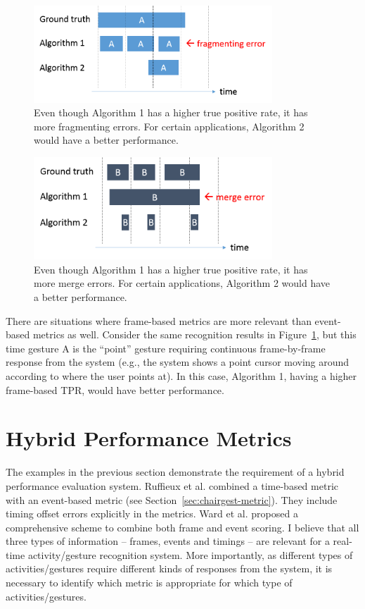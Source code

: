 \begin{figure}[tbh]
\centering
\includegraphics[width=0.8\textwidth]{figures/fragment.png}
\caption{Even though Algorithm 1 has a higher true positive rate, it has more
fragmenting errors. For certain applications, Algorithm 2 would have a better
performance.}
\label{fig:fragment}
\end{figure}

\begin{figure}[tbh]
\centering
\includegraphics[width=0.8\textwidth]{figures/merge.png}
\caption{Even though Algorithm 1 has a higher true positive rate, it has more
merge errors. For certain applications, Algorithm 2 would have a better
performance.}
\label{fig:merge}
\end{figure}

There are situations where frame-based metrics are more relevant than
event-based metrics as well. Consider the same recognition results in
Figure~\ref{fig:fragment}, but this time gesture A is the ``point'' gesture
requiring continuous frame-by-frame response from the system (e.g., the system
shows a point cursor moving around according to where the user points at). In this case,
Algorithm 1, having a higher frame-based TPR, would have
better performance.

\section{Hybrid Performance Metrics}\label{sec:metrics} 
The examples in the previous section demonstrate the requirement of a hybrid
performance evaluation system. Ruffieux et al. combined a time-based metric with
an event-based metric (see Section~\ref{sec:chairgest-metric}). They include timing offset errors
explicitly in the metrics. Ward et al. \cite{ward11} proposed a comprehensive
scheme to combine both frame and event scoring.
I believe that all three types of information -- frames, events and
timings -- are relevant for a real-time activity/gesture recognition system.
More importantly, as different types of activities/gestures require
different kinds of responses from the system, it is necessary to identify
which metric is appropriate for which type of activities/gestures.

